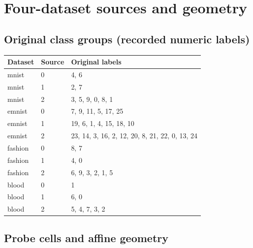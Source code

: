 \reservetable
\section{Four-dataset sources and geometry}

\reservetable
\subsection{Original class groups (recorded numeric labels)}

\begingroup\small
\setlength{\tabcolsep}{4pt}
\begin{longtable}{p{}p{}p{}}
\toprule

Dataset & Source & Original labels\\\midrule\endhead

mnist & 0 & 4, 6\\

mnist & 1 & 2, 7\\

mnist & 2 & 3, 5, 9, 0, 8, 1\\

emnist & 0 & 7, 9, 11, 5, 17, 25\\

emnist & 1 & 19, 6, 1, 4, 15, 18, 10\\

emnist & 2 & 23, 14, 3, 16, 2, 12, 20, 8, 21, 22, 0, 13, 24\\

fashion & 0 & 8, 7\\

fashion & 1 & 4, 0\\

fashion & 2 & 6, 9, 3, 2, 1, 5\\

blood & 0 & 1\\

blood & 1 & 6, 0\\

blood & 2 & 5, 4, 7, 3, 2\\

\bottomrule
\end{longtable}
\endgroup

\reservetable
\subsection{Probe cells and affine geometry}

